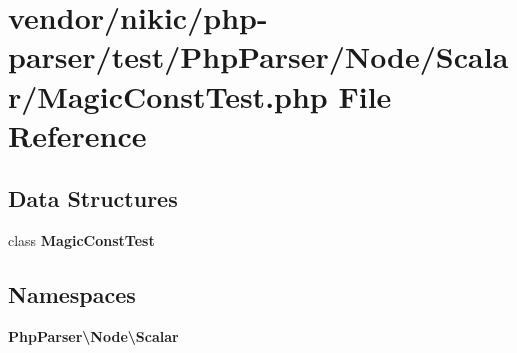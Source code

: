 \section{vendor/nikic/php-\/parser/test/\+Php\+Parser/\+Node/\+Scalar/\+Magic\+Const\+Test.php File Reference}
\label{_magic_const_test_8php}
\subsection*{Data Structures}
\begin{DoxyCompactItemize}
\item 
class {\bf Magic\+Const\+Test}
\end{DoxyCompactItemize}
\subsection*{Namespaces}
\begin{DoxyCompactItemize}
\item 
 {\bf Php\+Parser\textbackslash{}\+Node\textbackslash{}\+Scalar}
\end{DoxyCompactItemize}
